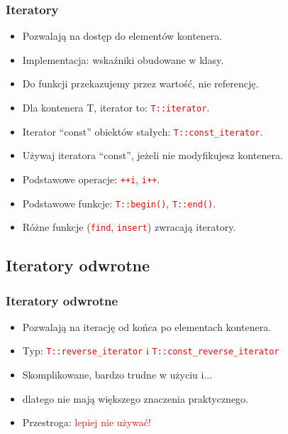 \documentclass[compress]{beamer}
\newcommand{\red}[1]{\textcolor{red}{#1}}
\newcommand{\code}[1]{\texttt{\red{#1}}}
\begin{document}
\begin{frame}

  \frametitle{Iteratory}

  \begin{itemize}
    \item Pozwalają na dostęp do elementów kontenera.
    \item Implementacja: wskaźniki obudowane w klasy.
    \item Do funkcji przekazujemy przez wartość, nie referencję.
    \item Dla kontenera T, iterator to: \code{T::iterator}.
    \item Iterator ``const'' obiektów stałych: \code{T::const\_iterator}.
    \item Używaj iteratora ``const'', jeżeli nie modyfikujesz kontenera.
    \item Podstawowe operacje: \code{++i}, \code{i++}.
    \item Podstawowe funkcje: \code{T::begin()}, \code{T::end()}.
    \item Różne funkcje (\code{find}, \code{insert}) zwracają iteratory.
  \end{itemize}

\end{frame}


\subsection{Iteratory odwrotne}

\begin{frame}

  \frametitle{Iteratory odwrotne}

  \begin{itemize}
  \item Pozwalają na iterację od końca po elementach kontenera.
  \item Typ: \code{T::reverse\_iterator} i \code{T::const\_reverse\_iterator}
  \item Skomplikowane, bardzo trudne w użyciu i...
  \item dlatego nie mają większego znaczenia praktycznego.
  \item Przestroga: \red{lepiej nie używać!}
  \end{itemize}

\end{frame}
\end{document}
